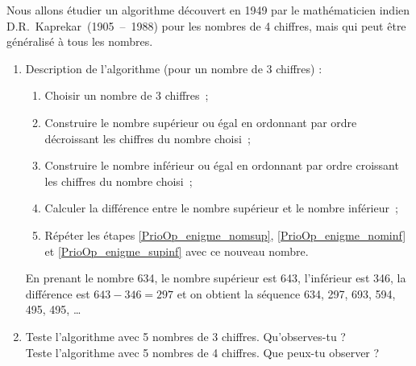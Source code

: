 \begin{enigme}

Nous allons étudier un algorithme découvert en 1949 par le mathématicien indien D.R. Kaprekar (1905 – 1988) pour les nombres de 4 chiffres, mais qui peut être généralisé à tous les nombres.

\begin{enumerate}
 \item Description de l'algorithme (pour un nombre de 3 chiffres) :
  \begin{enumerate}
   \item Choisir un nombre de 3 chiffres ;
   \item Construire le nombre supérieur ou égal en ordonnant par ordre décroissant les chiffres du nombre choisi ; \label{PrioOp_enigme_nomsup}
   \item Construire le nombre inférieur ou égal en ordonnant par ordre croissant les chiffres du nombre choisi ; \label{PrioOp_enigme_nominf}
   \item Calculer la différence entre le nombre supérieur et le nombre inférieur ; \label{PrioOp_enigme_supinf}
   \item Répéter les étapes \ref{PrioOp_enigme_nomsup}, \ref{PrioOp_enigme_nominf} et \ref{PrioOp_enigme_supinf} avec ce nouveau nombre.
   \end{enumerate}
   
\vspace{0.75em}

En prenant le nombre 634, le nombre supérieur est 643, l'inférieur est 346, la différence est  $643 - 346 = 297$ et on obtient la séquence 634, 297, 693, 594, 495, 495, \ldots

\vspace{1em}
   
 \item Teste l'algorithme avec 5 nombres de 3 chiffres. Qu'observes-tu ? \\[1em]
Teste l'algorithme avec 5 nombres de 4 chiffres. Que peux-tu observer ?

 \end{enumerate}
 
 \end{enigme}


